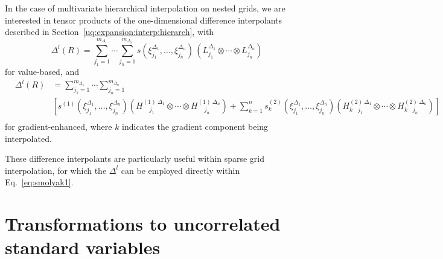 In the case of multivariate hierarchical interpolation on nested grids, 
we are interested in tensor products of the one-dimensional difference
interpolants described in Section~\ref{uq:expansion:interp:hierarch},
with
\begin{equation}
\Delta^l(R) = \sum_{j_1=1}^{m_{\Delta_1}}\cdots\sum_{j_n=1}^{m_{\Delta_n}}
s\left(\xi^{\Delta_1}_{j_1},\dots , \xi^{\Delta_n}_{j_n}\right)\,
\left(L^{\Delta_1}_{j_1}\otimes\cdots\otimes L^{\Delta_n}_{j_n}\right)
\label{eq:hierarch_interp_nd_L}
\end{equation}
for value-based, and
\begin{eqnarray}
& \Delta^l(R) & =
\sum_{j_1=1}^{m_{\Delta_1}} \cdots \sum_{j_n=1}^{m_{\Delta_n}} \nonumber \\
& & \left[ 
s^{(1)} \left( \xi^{\Delta_1}_{j_1}, \dots, \xi^{\Delta_n}_{j_n} \right)
\left( H^{(1)~\Delta_1}_{~~~~~j_1} \otimes \cdots \otimes H^{(1)~\Delta_n}_{~~~~~j_n}
\right) + \sum_{k=1}^n s_k^{(2)} \left(\xi^{\Delta_1}_{j_1}, \dots, \xi^{\Delta_n}_{j_n}\right)
\left(H^{(2)~\Delta_1}_{k~~~~j_1}\otimes\cdots\otimes H^{(2)~\Delta_n}_{k~~~~j_n}\right) 
\right] \nonumber \\
& & 
\label{eq:hierarch_interp_nd_H}
\end{eqnarray}
for gradient-enhanced, where $k$ indicates the gradient component being
interpolated.

These difference interpolants are particularly useful within sparse
grid interpolation, for which the $\Delta^l$ can be employed directly 
within Eq.~\ref{eq:smolyak1}.


\section{Transformations to uncorrelated standard variables} \label{uq:expansion:trans}

